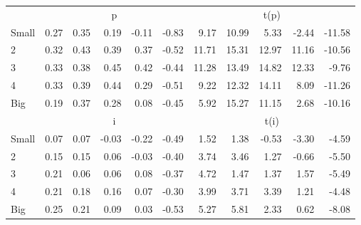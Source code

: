 \begin{table}[!ht]
\begin{tabular}{lrrrrrrrrrr}
      & \multicolumn{5}{c}{p} & \multicolumn{5}{c}{t(p)}
    
    \\
      \cmidrule(r){2-6} \cmidrule(r){7-11}

    Small   & 0.27  & 0.35  & 0.19  & -0.11  & -0.83  & 9.17  & 10.99  & 5.33  & -2.44  & -11.58  \\
         2  & 0.32  & 0.43  & 0.39  & 0.37  & -0.52  & 11.71  & 15.31  & 12.97  & 11.16  & -10.56  \\
         3  & 0.33  & 0.38  & 0.45  & 0.42  & -0.44  & 11.28  & 13.49  & 14.82  & 12.33  & -9.76  \\
         4  & 0.33  & 0.39  & 0.44  & 0.29  & -0.51  & 9.22  & 12.32  & 14.11  & 8.09  & -11.26  \\
    Big     & 0.19  & 0.37  & 0.28  & 0.08  & -0.45  & 5.92  & 15.27  & 11.15  & 2.68  & -10.16  \\

  
    
      & \multicolumn{5}{c}{i} & \multicolumn{5}{c}{t(i)}
    
    \\
      \cmidrule(r){2-6} \cmidrule(r){7-11}

    Small   & 0.07  & 0.07  & -0.03  & -0.22  & -0.49  & 1.52  & 1.38  & -0.53  & -3.30  & -4.59  \\
         2  & 0.15  & 0.15  & 0.06  & -0.03  & -0.40  & 3.74  & 3.46  & 1.27  & -0.66  & -5.50  \\
         3  & 0.21  & 0.06  & 0.06  & 0.08  & -0.37  & 4.72  & 1.47  & 1.37  & 1.57  & -5.49  \\
         4  & 0.21  & 0.18  & 0.16  & 0.07  & -0.30  & 3.99  & 3.71  & 3.39  & 1.21  & -4.48  \\
    Big     & 0.25  & 0.21  & 0.09  & 0.03  & -0.53  & 5.27  & 5.81  & 2.33  & 0.62  & -8.08  \\

  

  \bottomrule
\end{tabular}
\label{tbl:25_Size_Var_FF2015}
\end{table}